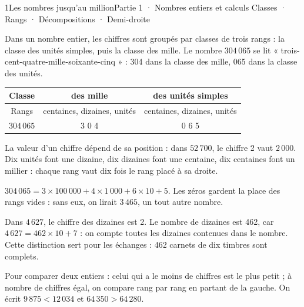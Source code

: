 \begin{ouverture}[calcul]{1}{Les nombres jusqu’au million}{Partie 1 · Nombres entiers et calculs}
{Classes · Rangs · Décompositions · Demi-droite}
\end{ouverture}
\pagestyle{otMain}\essentiel\fontsize{11}{15}\selectfont
{}\label{cours-1-1}
\begin{definition}Dans un nombre entier, les chiffres sont groupés par classes de trois rangs : la classe des unités simples, puis la classe des mille. Le nombre $304\,065$ se lit « trois-cent-quatre-mille-soixante-cinq » : 304 dans la classe des mille, 065 dans la classe des unités.\end{definition}\begin{center}\renewcommand{\arraystretch}{1.35}\begin{tabular}{c|cc}\toprule
Classe & des mille & des unités simples\\\midrule
Rangs & centaines, dizaines, unités & centaines, dizaines, unités\\
$304\,065$ & 3 0 4 & 0 6 5\\
\bottomrule\end{tabular}\end{center}
\begin{propriete}La valeur d’un chiffre dépend de sa position : dans $52\,700$, le chiffre 2 vaut $2\,000$. Dix unités font une dizaine, dix dizaines font une centaine, dix centaines font un millier : chaque rang vaut dix fois le rang placé à sa droite.\end{propriete}
\begin{exemple}$304\,065=3\times100\,000+4\times1\,000+6\times10+5$. Les zéros gardent la place des rangs vides : sans eux, on lirait $3\,465$, un tout autre nombre.\end{exemple}
\begin{savoirfaire}Dans $4\,627$, le chiffre des dizaines est 2. Le nombre de dizaines est 462, car $4\,627=462\times10+7$ : on compte toutes les dizaines contenues dans le nombre. Cette distinction sert pour les échanges : 462 carnets de dix timbres sont complets.\end{savoirfaire}
\clearpage
{}\label{cours-1-2}
\begin{propriete}Pour comparer deux entiers : celui qui a le moins de chiffres est le plus petit ; à nombre de chiffres égal, on compare rang par rang en partant de la gauche. On écrit $9\,875<12\,034$ et $64\,350>64\,280$.\end{propriete}
\label{fig-cours-1-2-cours-droite-mille}

